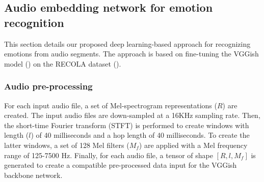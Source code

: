 \documentclass[times,twocolumn,final,authoryear]{elsarticle}
\begin{document}
	\subsection{Audio embedding network for emotion recognition}
	
	This section details our proposed deep learning-based approach for recognizing emotions from audio segments. The approach is based on fine-tuning the VGGish model (\cite{Vggish2017}) on the RECOLA dataset (\cite{recola}).
	
	\subsubsection{Audio pre-processing}
	\label{sec:audiopreproc}
	
	For each input audio file, a set of Mel-spectrogram representations ($R$) are created. The input audio files are down-sampled at a 16KHz sampling rate. Then, the short-time Fourier transform (STFT) is performed to create windows with length ($l$) of 40 milliseconds and a hop length of 40 milliseconds. To create the latter windows, a set of 128 Mel filters ($M_f$) are applied with a Mel frequency range of 125-7500 Hz. Finally, for each audio file, a tensor of shape $[R,l,M_f]$ is generated to create a compatible pre-processed data input for the VGGish backbone network. 
	
\end{document}
